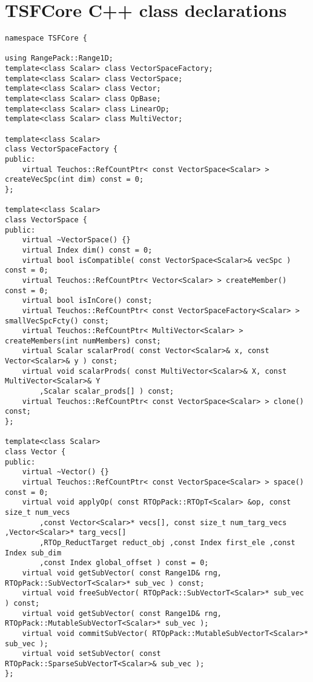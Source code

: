 %
\section{TSFCore C++ class declarations}
\label{app:tsfcore_classes}
%

{\scriptsize\begin{verbatim}
namespace TSFCore {

using RangePack::Range1D;
template<class Scalar> class VectorSpaceFactory;
template<class Scalar> class VectorSpace;
template<class Scalar> class Vector;
template<class Scalar> class OpBase;
template<class Scalar> class LinearOp;
template<class Scalar> class MultiVector;

template<class Scalar>
class VectorSpaceFactory {
public:
    virtual Teuchos::RefCountPtr< const VectorSpace<Scalar> > createVecSpc(int dim) const = 0;
};

template<class Scalar>
class VectorSpace {
public:
    virtual ~VectorSpace() {}
    virtual Index dim() const = 0;
    virtual bool isCompatible( const VectorSpace<Scalar>& vecSpc ) const = 0;
    virtual Teuchos::RefCountPtr< Vector<Scalar> > createMember() const = 0;
    virtual bool isInCore() const;
    virtual Teuchos::RefCountPtr< const VectorSpaceFactory<Scalar> > smallVecSpcFcty() const;
    virtual Teuchos::RefCountPtr< MultiVector<Scalar> > createMembers(int numMembers) const;
    virtual Scalar scalarProd( const Vector<Scalar>& x, const Vector<Scalar>& y ) const;
    virtual void scalarProds( const MultiVector<Scalar>& X, const MultiVector<Scalar>& Y
        ,Scalar scalar_prods[] ) const;
    virtual Teuchos::RefCountPtr< const VectorSpace<Scalar> > clone() const;
};

template<class Scalar>
class Vector {
public:
    virtual ~Vector() {}
    virtual Teuchos::RefCountPtr< const VectorSpace<Scalar> > space() const = 0;
    virtual void applyOp( const RTOpPack::RTOpT<Scalar> &op, const size_t num_vecs
        ,const Vector<Scalar>* vecs[], const size_t num_targ_vecs ,Vector<Scalar>* targ_vecs[]
        ,RTOp_ReductTarget reduct_obj ,const Index first_ele ,const Index sub_dim
        ,const Index global_offset ) const = 0;
    virtual void getSubVector( const Range1D& rng, RTOpPack::SubVectorT<Scalar>* sub_vec ) const;
    virtual void freeSubVector( RTOpPack::SubVectorT<Scalar>* sub_vec ) const;
    virtual void getSubVector( const Range1D& rng, RTOpPack::MutableSubVectorT<Scalar>* sub_vec );
    virtual void commitSubVector( RTOpPack::MutableSubVectorT<Scalar>* sub_vec );
    virtual void setSubVector( const RTOpPack::SparseSubVectorT<Scalar>& sub_vec );
};


\end{verbatim}}
